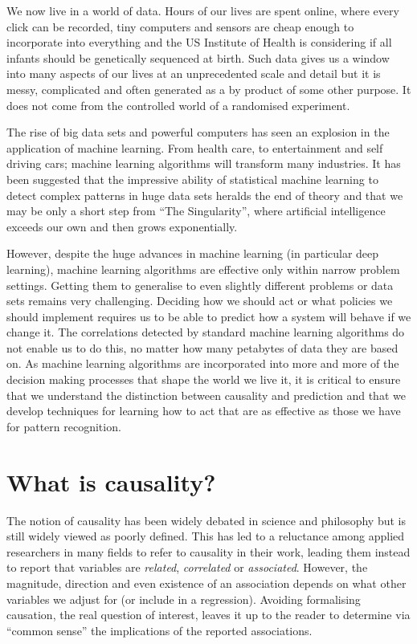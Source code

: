 \documentclass[11pt,a4paper,oneside]{book}
\newcommand{\quotes}[1]{``#1''}
\theoremstyle{plain}
\theoremstyle{definition}
\begin{document}
We now live in a world of data. Hours of our lives are spent online, where every click can be recorded, tiny computers and sensors are cheap enough to incorporate into everything and the US Institute of Health is considering if all infants should be genetically sequenced at birth. Such data gives us a window into many aspects of our lives at an unprecedented scale and detail but it is messy, complicated and often generated as a by product of some other purpose. It does not come from the controlled world of a randomised experiment.

The rise of big data sets and powerful computers has seen an explosion in the application of machine learning. From health care, to entertainment and self driving cars; machine learning algorithms will transform many industries. It has been suggested that the impressive ability of statistical machine learning to detect complex patterns in huge data sets heralds the end of theory \citep{anderson2008end} and that we may be only a short step from \quotes{The Singularity}, where artificial intelligence exceeds our own and then grows exponentially. 

However, despite the huge advances in machine learning (in particular deep learning), machine learning algorithms are effective only within narrow problem settings. Getting them to generalise to even slightly different problems or data sets remains very challenging. Deciding how we should act or what policies we should implement requires us to be able to predict how a system will behave if we change it. The correlations detected by standard machine learning algorithms do not enable us to do this, no matter how many petabytes of data they are based on. As machine learning algorithms are incorporated into more and more of the decision making processes that shape the world we live it, it is critical to ensure that we understand the distinction between causality and prediction and that we develop techniques for learning how to act that are as effective as those we have for pattern recognition.


\section{What is causality? }

The notion of causality has been widely debated in science and philosophy \citep{hume1741treatise,mill1893system,pearson1911grammar,Pearl2000,Lewis2000,woodward2005making,heckman20051,cartwright2007hunting} but is still widely viewed as poorly defined. This has led to a reluctance among applied researchers in many fields to refer to causality in their work, leading them instead to report that variables are \textit{related}, \textit{correlated} or \textit{associated}. However, the magnitude, direction and even existence of an association depends on what other variables we adjust for (or include in a regression). Avoiding formalising causation, the real question of interest, leaves it up to the reader to determine via \quotes{common sense} the implications of the reported associations.
\end{document}
